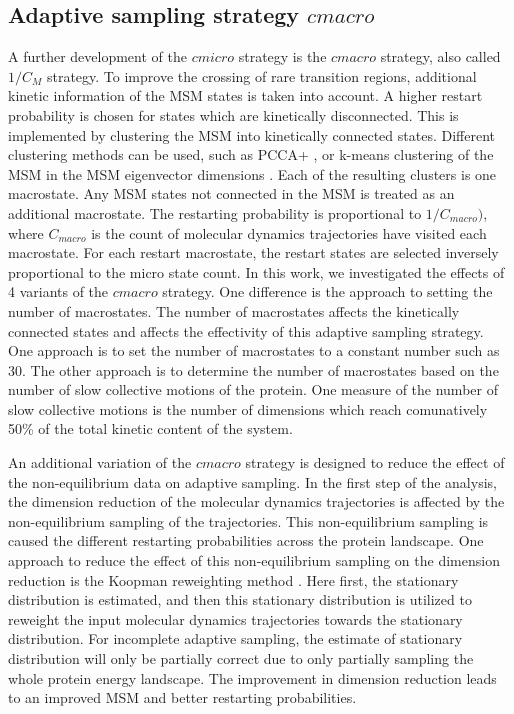\subsection{\label{sec:macro}Adaptive sampling strategy $cmacro$} 
A further development of the $cmicro$ strategy is the $cmacro$ strategy, also called $1/C_M$ strategy.
To improve the crossing of rare transition regions, additional kinetic information of the MSM states is taken into account. A higher restart probability is chosen for states which are kinetically disconnected. This is implemented by clustering the MSM into kinetically connected states. Different clustering methods can be used, such as
PCCA+ \cite{roblitz2013fuzzy}, or k-means clustering of the MSM in the MSM eigenvector dimensions \cite{preto2014fast, doerr2016htmd}. Each of the resulting clusters is one macrostate. Any MSM states not connected in the MSM is treated as an additional macrostate.  The restarting probability is proportional to $1/C_{macro})$, where $C_{macro}$ is the count of molecular dynamics trajectories have visited each macrostate. For each restart macrostate, the restart states are selected inversely proportional to the micro state count.
In this work, we investigated the effects of 4 variants of the $cmacro$ strategy. One difference is the approach to setting the number of macrostates. The number of macrostates affects the kinetically connected states and affects the effectivity of this adaptive sampling strategy. One approach is to set the number of macrostates to a constant number such as 30. The other approach is to determine the number of macrostates based on the number of slow collective motions of the protein. One measure of the number of slow collective motions is the number of dimensions which reach comunatively 50\% of the total kinetic content of the system. 

An additional variation of the $cmacro$ strategy is designed to reduce the effect of the non-equilibrium data on adaptive sampling. In the first step of the analysis, the dimension reduction of the molecular dynamics trajectories is affected by the non-equilibrium sampling of the trajectories. This non-equilibrium sampling is caused the different restarting probabilities across the protein landscape. One approach to reduce the effect of this non-equilibrium sampling on the dimension reduction is the Koopman reweighting method
\cite{koopmanold, koopman2,koopman3,koopman4, wu2017variational, Nueske2017}. Here first, the stationary distribution is estimated, and then this stationary distribution is utilized to reweight the input molecular dynamics trajectories towards the stationary distribution. For incomplete adaptive sampling, the estimate of stationary distribution will only be partially correct due to only partially sampling the whole protein energy landscape. The improvement in dimension reduction leads to an improved MSM and better restarting probabilities. 

